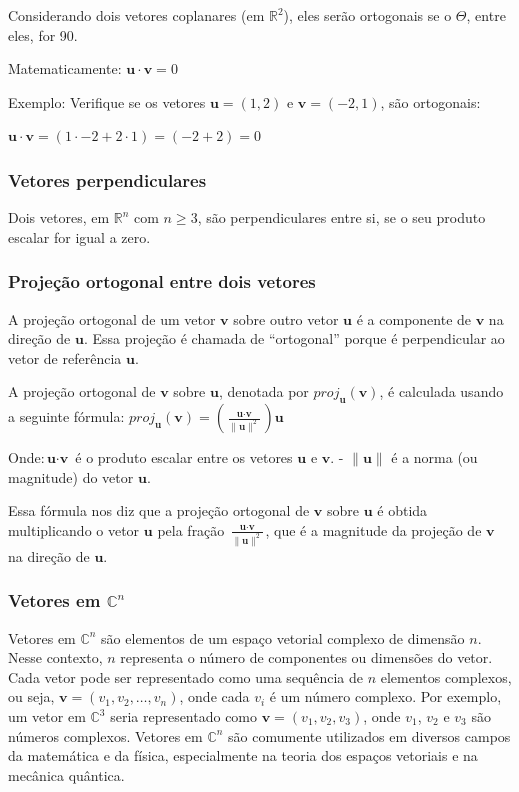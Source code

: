 \documentclass[12pt]{article}
\begin{document}
Considerando dois vetores coplanares (em \(\mathbb{R}^2\)), eles serão ortogonais se o $\Theta$, entre eles, for 90\degree.

Matematicamente: \(\textbf{u}  \cdot  \textbf{v} = 0\)

Exemplo: Verifique se os vetores \(\textbf{u} = (1, 2)\) e \(\textbf{v} = (-2, 1)\), são ortogonais:

\(\textbf{u}  \cdot  \textbf{v} = (1  \cdot  -2 + 2  \cdot  1) = (-2 + 2) = 0\)


\subsubsection{Vetores perpendiculares}

Dois vetores, em \(\mathbb{R}^n\) com \(\textit{n} \geq 3\), são perpendiculares entre si, se o seu produto escalar for igual a zero.

\subsubsection{Projeção ortogonal entre dois vetores}

A projeção ortogonal de um vetor \(\textbf{v}\) sobre outro vetor \(\textbf{u}\) é a componente de \(\textbf{v}\) na direção de \(\textbf{u}\). Essa projeção é chamada de \enquote{ortogonal} porque é perpendicular ao vetor de referência \(\textbf{u}\).

A projeção ortogonal de \(\textbf{v}\) sobre \(\textbf{u}\), denotada por \(proj_{\textbf{u}}(\textbf{v})\), é calculada usando a seguinte fórmula: \(proj_{\textbf{u}}(\textbf{v}) = \left( \frac{\textbf{u} \cdot \textbf{v}}{\|\textbf{u}\|^2} \right) \textbf{u}\)


Onde:\(\textbf{u}  \cdot  \textbf{v} \) é o produto escalar entre os vetores \( \textbf{u} \) e \( \textbf{v} \).
- \( \| \textbf{u} \| \) é a norma (ou magnitude) do vetor \( \textbf{u} \).

Essa fórmula nos diz que a projeção ortogonal de \( \textbf{v} \) sobre \( \textbf{u} \) é obtida multiplicando o vetor \( \textbf{u} \) pela fração \(\frac{\textbf{u} \cdot \textbf{v}}{\|\textbf{u}\|^2}\), que é a magnitude da projeção de \(\textbf{v} \) na direção de \(\textbf{u}\).

\subsubsection{Vetores em $\mathbb{C}^n$}

Vetores em $\mathbb{C}^n$ são elementos de um espaço vetorial complexo de dimensão $n$. Nesse contexto, $n$ representa o número de componentes ou dimensões do vetor. Cada vetor pode ser representado como uma sequência de $n$ elementos complexos, ou seja, $\textbf{v} = (v_1, v_2, \ldots, v_n)$, onde cada $v_i$ é um número complexo. Por exemplo, um vetor em $\mathbb{C}^3$ seria representado como $\textbf{v} = (v_1, v_2, v_3)$, onde $v_1$, $v_2$ e $v_3$ são números complexos. Vetores em $\mathbb{C}^n$ são comumente utilizados em diversos campos da matemática e da física, especialmente na teoria dos espaços vetoriais e na mecânica quântica.
\end{document}
